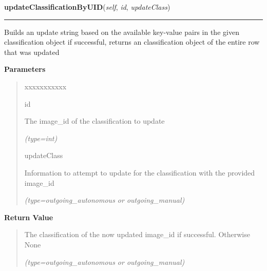 \hspace{.8\funcindent}\begin{boxedminipage}{\funcwidth}

    \raggedright \textbf{updateClassificationByUID}(\textit{self}, \textit{id}, \textit{updateClass})

    \vspace{-1.5ex}

    \rule{\textwidth}{0.5\fboxrule}
\setlength{\parskip}{2ex}
    Builds an update string based on the available key-value pairs in the 
    given classification object if successful, returns an classification 
    object of the entire row that was updated

\setlength{\parskip}{1ex}
      \textbf{Parameters}
      \vspace{-1ex}

      \begin{quote}
        \begin{Ventry}{xxxxxxxxxxx}

          \item[id]

          The image\_id of the classification to update

            {\it (type=int)}

          \item[updateClass]

          Information to attempt to update for the classification with the 
          provided image\_id

            {\it (type=outgoing\_autonomous or outgoing\_manual)}

        \end{Ventry}

      \end{quote}

      \textbf{Return Value}
    \vspace{-1ex}

      \begin{quote}
      The classification of the now updated image\_id if successful. 
      Otherwise None

      {\it (type=outgoing\_autonomous or outgoing\_manual)}

      \end{quote}

    \end{boxedminipage}

    \label{src:dao:classification_dao:ClassificationDAO:getAllDistinct}

